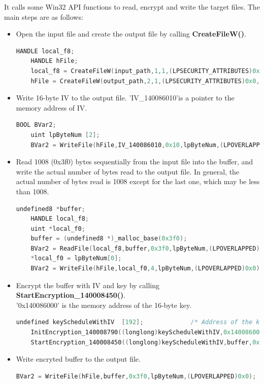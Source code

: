 \documentclass[11pt]{article}
\begin{document}
It calls some Win32 API functions to read, encrypt and write the target files. The main steps are as follows:

\begin{itemize}
  \item Open the input file and create the output file by calling \textbf{CreateFileW()}.
  \begin{lstlisting}[language=c++]
    HANDLE local_f8;
    HANDLE hFile;
    local_f8 = CreateFileW(input_path,1,1,(LPSECURITY_ATTRIBUTES)0x0,3,0x80,(HANDLE)0x0);
    hFile = CreateFileW(output_path,2,1,(LPSECURITY_ATTRIBUTES)0x0,4,0x80(HANDLE)0x0);\end{lstlisting}
  
  \item Write 16-byte IV to the output file. 'IV\_140086010'is a pointer to the memory address of IV.
  \begin{lstlisting}[language=c++]
    BOOL BVar2;
    uint lpByteNum [2];
    BVar2 = WriteFile(hFile,IV_140086010,0x10,lpByteNum,(LPOVERLAPPED)0x0)\end{lstlisting}

  \item Read 1008 (0x3f0) bytes sequentially from the input file into the buffer, and write the actual number of bytes read to the output file. In general, the actual number of bytes read is 1008 except for the last one, which may be less than 1008.
  \begin{lstlisting}[language=c++]
    undefined8 *buffer;
    HANDLE local_f8;
    uint *local_f0;
    buffer = (undefined8 *)_malloc_base(0x3f0);
    BVar2 = ReadFile(local_f8,buffer,0x3f0,lpByteNum,(LPOVERLAPPED)0x0);
    *local_f0 = lpByteNum[0];
    BVar2 = WriteFile(hFile,local_f0,4,lpByteNum,(LPOVERLAPPED)0x0);\end{lstlisting}

  \item Encrypt the buffer with IV and key by calling \textbf{StartEncryption\_140008450()}. \\'0x140086000' is the memory address of the 16-byte key.
  \begin{lstlisting}[language=c++]
    undefined keyScheduleWithIV  [192];             /* Address of the key*/
    InitEncryption_140008790((longlong)keyScheduleWithIV,0x140086000,(undefined8 *)IV_140086010);
    StartEncryption_140008450((longlong)keyScheduleWithIV,buffer,0x3f0);\end{lstlisting}

  \item Write encryted buffer to the output file.
  \begin{lstlisting}[language=c++]
    BVar2 = WriteFile(hFile,buffer,0x3f0,lpByteNum,(LPOVERLAPPED)0x0);\end{lstlisting}
\end{itemize}
\end{document}
